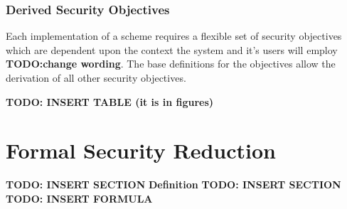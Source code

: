 \subsubsection{Derived Security Objectives}

Each implementation of a scheme requires a flexible set of security objectives which are dependent upon the context the system and it's users will employ \textbf{TODO:change wording}. The base definitions for the objectives allow the derivation of all other security objectives.

\newline
\textbf{TODO: INSERT TABLE (it is in figures)}
\newline
\section{Formal Security Reduction} 
\textbf{TODO: INSERT SECTION}
\textbf{Definition}
\textbf{TODO: INSERT SECTION}
\textbf{TODO: INSERT FORMULA}


